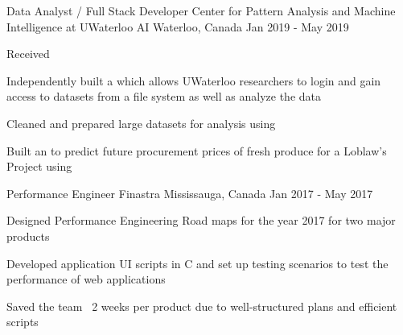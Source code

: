 \begin{cventries}
  \cventry
    {Data Analyst / Full Stack Developer} %
    {Center for Pattern Analysis and Machine Intelligence at UWaterloo AI} %
    {Waterloo, Canada} %
    {Jan 2019 - May 2019} %
    {
      \begin{cvitems} %
        \item {Received }
        \item{Independently built a  which allows UWaterloo researchers to login and gain access to datasets from a file system as well as analyze the data}
        \item {Cleaned and prepared large datasets for analysis using }
        \item {Built an  to predict future procurement prices of fresh produce for a Loblaw’s Project using }
      \end{cvitems}
    }
  \cventry
    {Performance Engineer} %
    {Finastra} %
    {Mississauga, Canada} %
    {Jan 2017 - May 2017} %
    {
      \begin{cvitems} %
        \item {Designed Performance Engineering Road maps for the year 2017 for two major products}
        \item {Developed application UI scripts in C and set up testing scenarios to test the performance of web applications}
        \item {Saved the team ~2 weeks per product due to well-structured plans and efficient scripts}
      \end{cvitems}
    }

\end{cventries}
